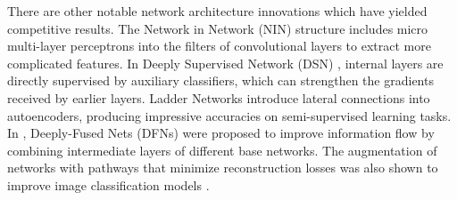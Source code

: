 There are other notable network architecture innovations which have yielded competitive results. The Network in Network (NIN) \cite{netinnet} structure includes micro multi-layer perceptrons into the filters of convolutional layers to extract more complicated features. In Deeply Supervised Network (DSN) \cite{dsn}, internal layers are directly supervised by auxiliary classifiers, which can strengthen the gradients received by earlier layers. Ladder Networks \cite{rasmus2015semi,pezeshki2015deconstructing} introduce lateral connections into autoencoders, producing impressive accuracies on semi-supervised learning tasks. In \cite{wang2016deeply}, Deeply-Fused Nets (DFNs) were proposed to improve information flow by combining intermediate layers of different base networks.
The augmentation of networks with pathways that minimize reconstruction losses was also shown to improve image classification models \cite{zhang2016augmenting}.



%
%
%
%
%
%

